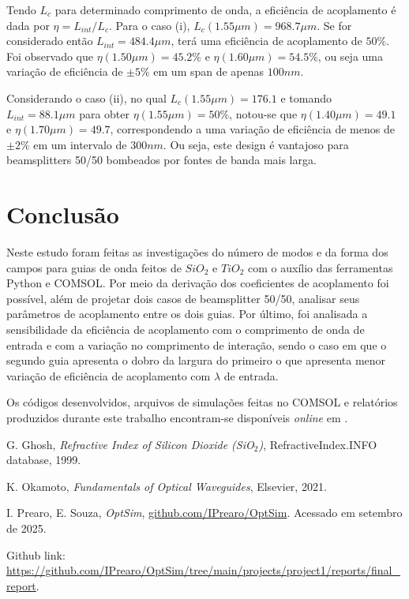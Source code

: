 \documentclass[final,12pt,times,twocolumn]{elsarticle}
\begin{document}
Tendo $L_c$ para determinado comprimento de onda, a eficiência de acoplamento é dada por $\eta = L_{int} / L_c$. Para o caso (i), $L_c(1.55\mu m) = 968.7\mu m$. Se for considerado então $L_{int} = 484.4\mu m$, terá uma eficiência de acoplamento de $50\%$. Foi observado que $\eta(1.50\mu m) = 45.2\%$ e $\eta(1.60\mu m) = 54.5\%$, ou seja uma variação de eficiência de $\pm 5\%$ em um span de apenas $100nm$.

Considerando o caso (ii), no qual $L_c(1.55\mu m) = 176.1$ e tomando $L_{int} = 88.1 \mu m$ para obter $\eta(1.55\mu m) = 50\%$, notou-se que $\eta(1.40\mu m) = 49.1$ e $\eta(1.70\mu m) = 49.7$, correspondendo a uma variação de eficiência de menos de $\pm 2\%$ em um intervalo de $300nm$. Ou seja, este design é vantajoso para beamsplitters 50/50 bombeados por fontes de banda mais larga. 

\section{Conclusão}
\label{sec:conclusion}

Neste estudo foram feitas as investigações do número de modos e da forma dos campos para guias de onda feitos de $SiO_2$ e $TiO_2$ com o auxílio das ferramentas Python e COMSOL. Por meio da derivação dos coeficientes de acoplamento foi possível, além de projetar dois casos de beamsplitter 50/50, analisar seus parâmetros de acoplamento entre os dois guias. Por último, foi analisada a sensibilidade da eficiência de acoplamento com o comprimento de onda de entrada e com a variação no comprimento de interação, sendo o caso em que o segundo guia apresenta o dobro da largura do primeiro o que apresenta menor variação de eficiência de acoplamento com $\lambda$ de entrada.

Os códigos desenvolvidos, arquivos de simulações feitas no COMSOL e relatórios produzidos durante este trabalho encontram-se disponíveis \textit{online} em \cite{github}.

\begin{thebibliography}{99}


G. Ghosh, \textit{Refractive Index of Silicon Dioxide (SiO$_2$)}, RefractiveIndex.INFO database, 1999.

K. Okamoto, \textit{Fundamentals of Optical Waveguides}, Elsevier, 2021.

I. Prearo, E. Souza, \textit{OptSim}, \url{github.com/IPrearo/OptSim}. Acessado em setembro de 2025.

\end{thebibliography}

Github link: \url{https://github.com/IPrearo/OptSim/tree/main/projects/project1/reports/final_report}.
\end{document}
